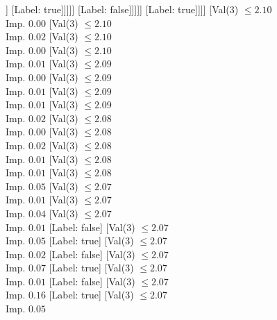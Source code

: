 \documentclass[margin=10pt]{standalone}
\begin{document}
\begin{forest}
																			[Val($3$) $ \leq 2.06$ \\ Imp. $0.50$
																				[Label: true]
																				[Label: false]]
																			[Label: true]]]]]
															[Label: false]]]]]
											[Label: true]]]]
								[Val($3$) $ \leq 2.10$ \\ Imp. $0.00$
									[Val($3$) $ \leq 2.10$ \\ Imp. $0.02$
										[Val($3$) $ \leq 2.10$ \\ Imp. $0.00$
											[Val($3$) $ \leq 2.10$ \\ Imp. $0.01$
												[Val($3$) $ \leq 2.09$ \\ Imp. $0.00$
													[Val($3$) $ \leq 2.09$ \\ Imp. $0.01$
														[Val($3$) $ \leq 2.09$ \\ Imp. $0.01$
															[Val($3$) $ \leq 2.09$ \\ Imp. $0.02$
																[Val($3$) $ \leq 2.08$ \\ Imp. $0.00$
																	[Val($3$) $ \leq 2.08$ \\ Imp. $0.02$
																		[Val($3$) $ \leq 2.08$ \\ Imp. $0.01$
																			[Val($3$) $ \leq 2.08$ \\ Imp. $0.01$
																				[Val($3$) $ \leq 2.08$ \\ Imp. $0.05$
																					[Val($3$) $ \leq 2.07$ \\ Imp. $0.01$
																						[Val($3$) $ \leq 2.07$ \\ Imp. $0.04$
																							[Val($3$) $ \leq 2.07$ \\ Imp. $0.01$
																								[Label: false]
																								[Val($3$) $ \leq 2.07$ \\ Imp. $0.05$
																									[Label: true]
																									[Val($3$) $ \leq 2.07$ \\ Imp. $0.02$
																										[Label: false]
																										[Val($3$) $ \leq 2.07$ \\ Imp. $0.07$
																											[Label: true]
																											[Val($3$) $ \leq 2.07$ \\ Imp. $0.01$
																												[Label: false]
																												[Val($3$) $ \leq 2.07$ \\ Imp. $0.16$
																													[Label: true]
																													[Val($3$) $ \leq 2.07$ \\ Imp. $0.05$

\end{forest}
\end{document}
